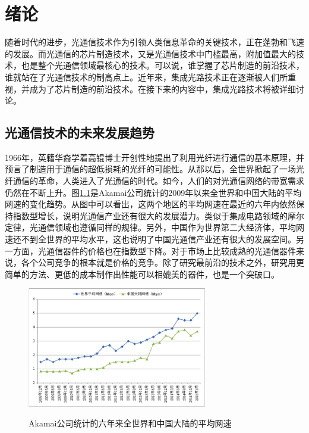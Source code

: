 \documentclass{ZJUthesis}
\begin{document}
\chapter{绪论}

随着时代的进步，光通信技术作为引领人类信息革命的关键技术，正在蓬勃和飞速的发展。而光通信的芯片制造技术，又是光通信技术中门槛最高，附加值最大的技术，也是整个光通信领域最核心的技术。可以说，谁掌握了芯片制造的前沿技术，谁就站在了光通信技术的制高点上。近年来，集成光路技术正在逐渐被人们所重视，并成为了芯片制造的前沿技术。在接下来的内容中，集成光路技术将被详细讨论。

\section{光通信技术的未来发展趋势}

1966年，英籍华裔学着高锟博士开创性地提出了利用光纤进行通信的基本原理，并预言了制造用于通信的超低损耗的光纤的可能性\cite{kao1966dielectric}。从那以后，全世界掀起了一场光纤通信的革命，人类进入了光通信的时代。如今，人们的对光通信网络的带宽需求仍然在不断上升。图\ref{fig_akamai}是Akamai公司统计的2009年以来全世界和中国大陆的平均网速的变化趋势。从图中可以看出，这两个地区的平均网速在最近的六年内依然保持指数型增长，说明光通信产业还有很大的发展潜力。类似于集成电路领域的摩尔定律，光通信领域也遵循同样的规律。另外，中国作为世界第二大经济体，平均网速还不到全世界的平均水平，这也说明了中国光通信产业还有很大的发展空间。另一方面，光通信器件的价格也在指数型下降。对于市场上比较成熟的光通信器件来说，各个公司竞争的根本就是价格的竞争。除了研究最前沿的技术之外，研究用更简单的方法、更低的成本制作出性能可以相媲美的器件，也是一个突破口。

\begin{figure}[!ht]
  \centering
  \includegraphics[width=0.7\textwidth]{./Pictures/akamai.eps}\\
  \caption{Akamai公司统计的六年来全世界和中国大陆的平均网速}
  \label{fig_akamai}
\end{figure}
\end{document}
